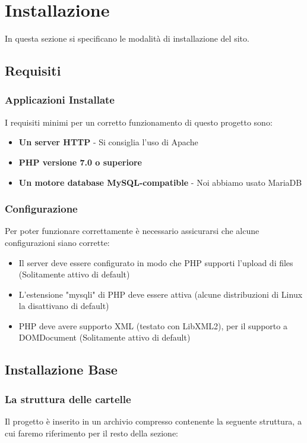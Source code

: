 \section{Installazione}
In questa sezione si specificano le modalità di installazione del sito.

\subsection{Requisiti}
\subsubsection{Applicazioni Installate}
I requisiti minimi per un corretto funzionamento di questo progetto sono:
\begin{itemize}
\item \textbf{Un server HTTP} - Si consiglia l'uso di Apache
\item \textbf{PHP versione 7.0 o superiore}
\item \textbf{Un motore database MySQL-compatible} - Noi abbiamo usato MariaDB
\end{itemize}
\subsubsection{Configurazione}
Per poter funzionare correttamente è necessario assicurarsi che alcune configurazioni siano corrette:
\begin{itemize}
\item Il server deve essere configurato in modo che PHP supporti l'upload di files (Solitamente attivo di default)
\item L'estensione "mysqli" di PHP deve essere attiva (alcune distribuzioni di Linux la disattivano di default)
\item PHP deve avere supporto XML (testato con LibXML2), per il supporto a DOMDocument (Solitamente attivo di default)
\end{itemize}

\subsection{Installazione Base}
\subsubsection{La struttura delle cartelle}
Il progetto è inserito in un archivio compresso contenente la seguente struttura, a cui faremo riferimento per il resto della sezione:
